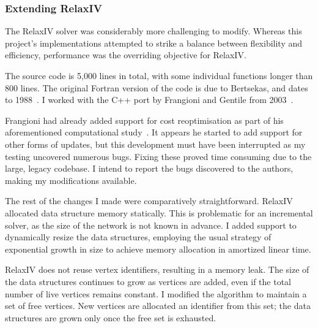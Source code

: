 \subsubsection{Extending RelaxIV}
The RelaxIV solver was considerably more challenging to modify. Whereas this project's implementations attempted to strike a balance between flexibility and efficiency, performance was the overriding objective for RelaxIV. 

The source code is 5,000 lines in total, with some individual functions longer than 800 lines. The original Fortran version of the code is due to Bertsekas, and dates to 1988~\cite{BertsekasCodes:1988}. I worked with the C++ port by Frangioni and Gentile from 2003~\cite{RelaxIV:2011}.


Frangioni had already added support for cost reoptimisation as part of his aforementioned computational study~\cite{Frangioni:2006}. It appears he started to add support for other forms of updates, but this development must have been interrupted as my testing uncovered numerous bugs. Fixing these proved time consuming due to the large, legacy codebase. I intend to report the bugs discovered to the authors, making my modifications available.

The rest of the changes I made were comparatively straightforward. RelaxIV allocated data structure memory statically. This is problematic for an incremental solver, as the size of the network is not known in advance. I added support to dynamically resize the data structures, employing the usual strategy of exponential growth in size to achieve memory allocation in amortized linear time\footnotemark.

RelaxIV does not reuse vertex identifiers, resulting in a memory leak. The size of the data structures continues to grow as vertices are added, even if the total number of live vertices remains constant. I modified the algorithm to maintain a set of free vertices. New vertices are allocated an identifier from this set; the data structures are grown only once the free set is exhausted.

